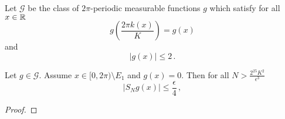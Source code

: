 {Let $\mathcal{G}$ be the class of $2\pi$-periodic measurable functions $g$ which satisfy for all $x\in {\mathbb{R}}$
\begin{equation}
   g(\frac{2\pi k(x)}K)=g(x)
\end{equation}
and
\begin{equation}
   |g(x)|\le 2\, .
\end{equation}



\begin{lemma}
\label{flat-interval-partial-sum}
Let $g\in \mathcal{G}$. Assume
$x\in [0,2\pi)\setminus E_1 $ and $g(x)=0$.
Then for all $N>\frac {2^{25} K^2}{\epsilon^3}$
\begin{equation}\label{single-char-f}
|S_Ng(x)|\le \frac \epsilon 4\, ,
\end{equation}
\end{lemma}
\begin{proof}







\end{proof}}

